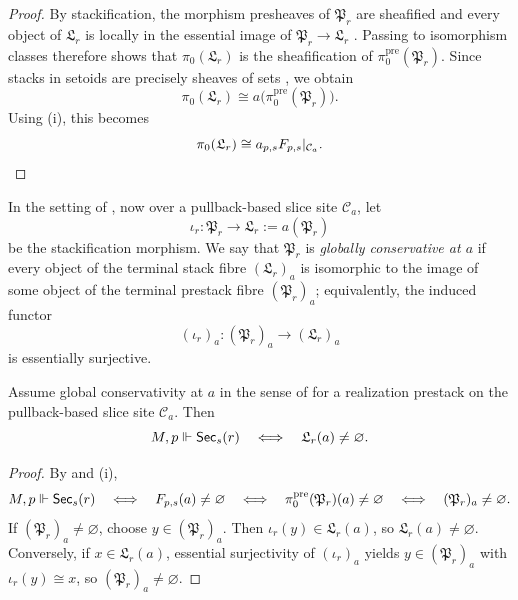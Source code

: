 \begin{proof}
By stackification, the morphism presheaves of $\mathfrak P_r$ are sheafified and every object of $\mathfrak L_r$ is locally in the essential image of $\mathfrak P_r\to \mathfrak L_r$ \cite[Tag 02ZP]{StacksProject}. Passing to isomorphism classes therefore shows that $\pi_0(\mathfrak L_r)$ is the sheafification of $\pi_0^{\mathrm{pre}}(\mathfrak P_r)$. Since stacks in setoids are precisely sheaves of sets \cite[Tag 042Y]{StacksProject}, we obtain
\[
\pi_0(\mathfrak L_r)\cong a\bigl(\pi_0^{\mathrm{pre}}(\mathfrak P_r)\bigr).
\]
Using (i), this becomes
\[
\pi_0(\mathfrak L_r)\cong a_{p,s}F_{p,s}|_{\mathcal C_a}.
\qedhere
\]
\end{proof}

\begin{definition}\label{def:global-conservativity}
In the setting of , now over a pullback-based slice site $\mathcal C_a$, let
\[
\iota_r:\mathfrak P_r\to \mathfrak L_r:=a(\mathfrak P_r)
\]
be the stackification morphism. We say that $\mathfrak P_r$ is \emph{globally conservative at $a$} if every object of the terminal stack fibre $(\mathfrak L_r)_a$ is isomorphic to the image of some object of the terminal prestack fibre $(\mathfrak P_r)_a$; equivalently, the induced functor
\[
(\iota_r)_a:(\mathfrak P_r)_a\to (\mathfrak L_r)_a
\]
is essentially surjective.
\end{definition}

\begin{proposition}\label{prop:no-new-global-objects}
Assume global conservativity at $a$ in the sense of  for a realization prestack on the pullback-based slice site $\mathcal C_a$. Then
\[
M,p\Vdash \mathsf{Sec}_s(r)
\quad\Longleftrightarrow\quad
\mathfrak L_r(a)\neq\varnothing.
\]
\end{proposition}

\begin{proof}
By  and (i),
\[
M,p\Vdash \mathsf{Sec}_s(r)
\quad\Longleftrightarrow\quad
F_{p,s}(a)\neq\varnothing
\quad\Longleftrightarrow\quad
\pi_0^{\mathrm{pre}}(\mathfrak P_r)(a)\neq\varnothing
\quad\Longleftrightarrow\quad
(\mathfrak P_r)_a\neq\varnothing.
\]
If $(\mathfrak P_r)_a\neq\varnothing$, choose $y\in (\mathfrak P_r)_a$. Then $\iota_r(y)\in \mathfrak L_r(a)$, so $\mathfrak L_r(a)\neq\varnothing$. Conversely, if $x\in \mathfrak L_r(a)$, essential surjectivity of $(\iota_r)_a$ yields $y\in (\mathfrak P_r)_a$ with $\iota_r(y)\cong x$, so $(\mathfrak P_r)_a\neq\varnothing$.
\end{proof}

